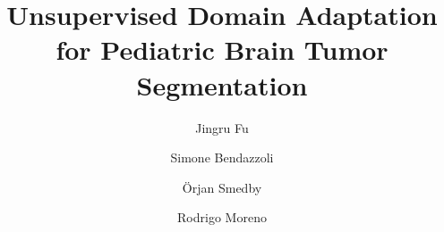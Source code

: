 \documentclass[runningheads]{llncs}
\begin{document}
%

\title{Unsupervised Domain Adaptation for Pediatric Brain Tumor Segmentation}


%


\author{Jingru Fu \and
Simone Bendazzoli \and
Örjan Smedby \and
Rodrigo Moreno}
%
\end{document}
